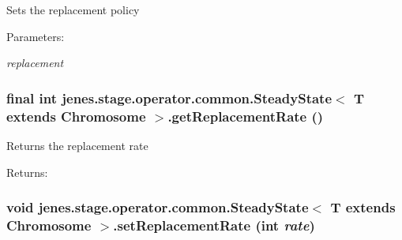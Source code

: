 Sets the replacement policy

\begin{Desc}
\item[Parameters:]
\begin{description}
\item[{\em replacement}]\end{description}
\end{Desc}
\hypertarget{classjenes_1_1stage_1_1operator_1_1common_1_1_steady_state_3_01_t_01extends_01_chromosome_01_4_32b13dd16c8bb611085477f02bc23cfc}{
\subsubsection[getReplacementRate]{\setlength{\rightskip}{0pt plus 5cm}final int jenes.stage.operator.common.SteadyState$<$ T extends Chromosome $>$.getReplacementRate ()}}
\label{classjenes_1_1stage_1_1operator_1_1common_1_1_steady_state_3_01_t_01extends_01_chromosome_01_4_32b13dd16c8bb611085477f02bc23cfc}


Returns the replacement rate

\begin{Desc}
\item[Returns:]\end{Desc}
\hypertarget{classjenes_1_1stage_1_1operator_1_1common_1_1_steady_state_3_01_t_01extends_01_chromosome_01_4_8e504ea91d2e2c18fefa54042388e188}{
\subsubsection[setReplacementRate]{\setlength{\rightskip}{0pt plus 5cm}void jenes.stage.operator.common.SteadyState$<$ T extends Chromosome $>$.setReplacementRate (int {\em rate})}}
\label{classjenes_1_1stage_1_1operator_1_1common_1_1_steady_state_3_01_t_01extends_01_chromosome_01_4_8e504ea91d2e2c18fefa54042388e188}


